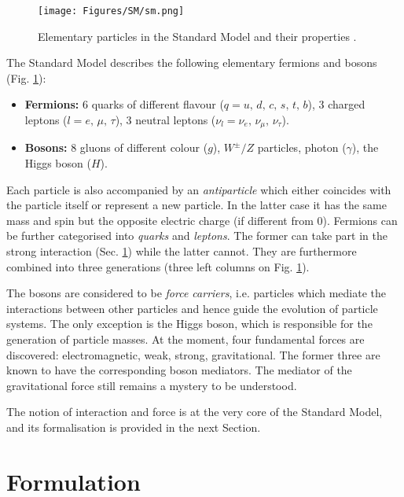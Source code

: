 \begin{figure}[h!]
    \centering
    \texttt{[image: Figures/SM/sm.png]}
    \caption{Elementary particles in the Standard Model and their properties \cite{SM:web-plot}.}
    \label{fig:sm}
\end{figure}

The Standard Model describes the following elementary fermions and bosons (Fig. \ref{fig:sm}):
\begin{itemize}
    \item \textbf{Fermions:} 6 quarks of different flavour ($q = u, \,d, \,c, \,s, \,t, \,b$), 3 charged leptons ($l = e, \,\mu, \,\tau$), 3 neutral leptons ($\nu_l= \nu_e, \,\nu_\mu, \,\nu_\tau$).
    \item \textbf{Bosons:} 8 gluons of different colour ($g$), $W^\pm/Z$ particles, photon ($\gamma$), the Higgs boson ($H$). 
\end{itemize}

Each particle is also accompanied by an \textit{antiparticle} which either coincides with the particle itself or represent a new particle. In the latter case it has the same mass and spin but the opposite electric charge (if different from 0). Fermions can be further categorised into \textit{quarks} and \textit{leptons}. The former can take part in the strong interaction (Sec. \ref{sec:lagr}) while the latter cannot. They are furthermore combined into three generations (three left columns on Fig. \ref{fig:sm}).

The bosons are considered to be \textit{force carriers}, i.e. particles which mediate the interactions between other particles and hence guide the evolution of particle systems. The only exception is the Higgs boson, which is responsible for the generation of particle masses. At the moment, four fundamental forces are discovered: electromagnetic, weak, strong, gravitational. The former three are known to have the corresponding boson mediators. The mediator of the gravitational force still remains a mystery to be understood. 

The notion of interaction and force is at the very core of the Standard Model, and its formalisation is provided in the next Section. 

\section{Formulation}\label{sec:lagr}

